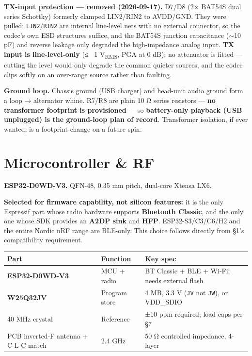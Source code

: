 \documentclass[11pt]{article}
\begin{document}
\textbf{TX-input protection — removed (2026-09-17).} D7/D8 (2× BAT54S dual series Schottky) formerly
clamped LIN2/RIN2 to AVDD/GND. They were pulled: \texttt{LIN2}/\texttt{RIN2} are internal line-level
nets with no external connector, so the codec's own ESD structures suffice, and the BAT54S junction
capacitance ($\sim$10 pF) and reverse leakage only degraded the high-impedance analog input.
\textbf{TX input is line-level-only} (≤ ~1 V\textsubscript{RMS}, PGA at 0 dB): no attenuator is
fitted — cutting the level would only degrade the common quieter sources, and the codec clips softly
on an over-range source rather than faulting.

\textbf{Ground loop.} Chassis ground (USB charger) and head-unit audio ground form a loop →
alternator whine. R7/R8 are plain 10 Ω series resistors — \textbf{no transformer footprint is
provisioned} — so \textbf{battery-only playback (USB unplugged) is the ground-loop plan of record}.
Transformer isolation, if ever wanted, is a footprint change on a future spin.

\section{Microcontroller \& RF}

\textbf{ESP32-D0WD-V3.} QFN-48, 0.35 mm pitch, dual-core Xtensa LX6.

\textbf{Selected for firmware capability, not silicon features:} it is the only Espressif part whose
radio hardware supports \textbf{Bluetooth Classic}, and the only one whose SDK provides an \textbf{A2DP
sink} and \textbf{HFP}. ESP32-S3/C3/C6/H2 and the entire Nordic nRF range are BLE-only. This choice
follows directly from §1's compatibility requirement.

\begin{tabularx}{\linewidth}{@{}l l X@{}}
\toprule
\textbf{Part} & \textbf{Function} & \textbf{Key spec} \\
\midrule
\textbf{ESP32-D0WD-V3} & MCU + radio & BT Classic + BLE + Wi-Fi; needs external flash \\
\textbf{W25Q32JV} & Program store & 4 MB, 3.3 V (\texttt{JV} not \texttt{JW}), on VDD_SDIO \\
40 MHz crystal & Reference & ±10 ppm required; load caps per §7 \\
PCB inverted-F antenna + C-L-C match & 2.4 GHz & 50 Ω controlled impedance, 4-layer \\
\bottomrule
\end{tabularx}
\end{document}
